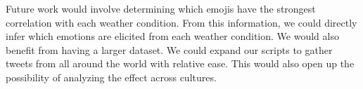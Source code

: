 \documentclass[12pt]{article}
\begin{document}
Future work would involve determining which emojis have the strongest correlation with each weather condition. From this information, we could directly infer which emotions are elicited from each weather condition. We would also benefit from having a larger dataset. We could expand our scripts to gather tweets from all around the world with relative ease. This would also open up the possibility of analyzing the effect across cultures.



\end{document}
